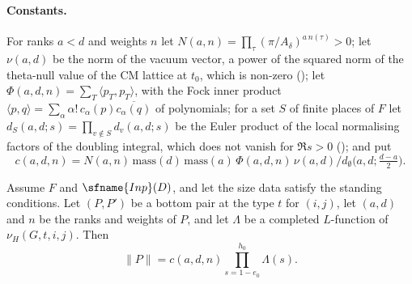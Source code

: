 \paragraph{Constants.}
For ranks $a<d$ and weights $n$ let $N(a,n)=\prod_\tau(\pi/A_\delta)^{a\,n(\tau)}>0$; let $\nu(a,d)$ be the norm of the
vacuum vector, a power of the squared norm of the theta-null value of the CM lattice at $t_0$, which is non-zero
(); let $\Phi(a,d,n)=\sum_T\langle p_T,p_T\rangle$, with the
Fock inner product $\langle p,q\rangle=\sum_\alpha\alpha!\,c_\alpha(p)\overline{c_\alpha(q)}$ of polynomials; for a set $S$ of
finite places of $F$ let $d_S(a,d;s)=\prod_{v\notin S}d_v(a,d;s)$ be the Euler product of the local normalising factors of
the doubling integral, which does not vanish for $\Re s>0$ (); and put
\[
c(a,d,n)=N(a,n)\,\mathrm{mass}(d)\,\mathrm{mass}(a)\,\Phi(a,d,n)\,\nu(a,d)\big/d_\emptyset\bigl(a,d;\tfrac{d-a}2\bigr).
\]

\begin{lemma}\label{pf:fit:pet}
Assume $F$ and $\sfname{Inp}(D)$, and let the size data satisfy the standing conditions. Let $(P,P')$ be a bottom pair at the
type $t$ for $(i,j)$, let $(a,d)$ and $n$ be the ranks and weights of $P$, and let $\Lambda$ be a completed $L$-function of
$\nu_H(G,t,i,j)$. Then
\[
\|P\|=c(a,d,n)\prod_{s=1-e_0}^{h_0}\Lambda(s).
\]
\end{lemma}

